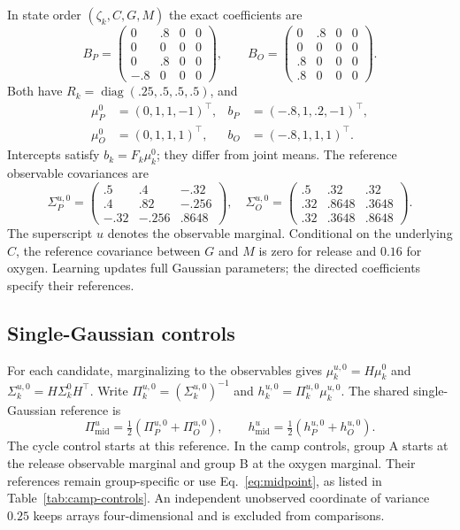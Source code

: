 \documentclass[runningheads]{llncs}
\newcommand{\diag}{\operatorname{diag}}
\begin{document}
In state order $(\zeta_k,C,G,M)$ the exact coefficients are
\begin{equation}
 B_P=\begin{pmatrix}0&.8&0&0\\0&0&0&0\\0&.8&0&0\\-.8&0&0&0\end{pmatrix},\qquad
 B_O=\begin{pmatrix}0&.8&0&0\\0&0&0&0\\.8&0&0&0\\.8&0&0&0\end{pmatrix}.
 \label{eq:B}
\end{equation}
Both have $R_k=\diag(.25,.5,.5,.5)$, and
\begin{equation}
 \begin{aligned}
 \mu^0_P&=(0,1,1,-1)^\top,& b_P&=(-.8,1,.2,-1)^\top,\\
 \mu^0_O&=(0,1,1,1)^\top,& b_O&=(-.8,1,1,1)^\top.
 \end{aligned}
 \label{eq:means-intercepts}
\end{equation}
Intercepts satisfy $b_k=F_k\mu^0_k$; they differ from joint means.
The reference observable covariances are
\begin{equation}
 \Sigma_P^{u,0}=\begin{pmatrix}.5&.4&-.32\\.4&.82&-.256\\-.32&-.256&.8648\end{pmatrix},\quad
 \Sigma_O^{u,0}=\begin{pmatrix}.5&.32&.32\\.32&.8648&.3648\\.32&.3648&.8648\end{pmatrix}.
 \label{eq:observable-covariances}
\end{equation}
The superscript $u$ denotes the observable marginal. Conditional on the
underlying $C$, the reference covariance between $G$ and $M$ is zero for release
and $0.16$ for oxygen. Learning updates full Gaussian parameters; the directed
coefficients specify their references.

\subsection{Single-Gaussian controls}
\label{app:baselines}
For each candidate, marginalizing to the observables gives
$\mu_k^{u,0}=H\mu_k^0$ and $\Sigma_k^{u,0}=H\Sigma_k^0H^\top$.
Write $\Pi_k^{u,0}=(\Sigma_k^{u,0})^{-1}$ and
$h_k^{u,0}=\Pi_k^{u,0}\mu_k^{u,0}$. The shared single-Gaussian reference is
\begin{equation}
 \Pi_{\mathrm{mid}}^u=\tfrac12(\Pi_P^{u,0}+\Pi_O^{u,0}),\qquad
 h_{\mathrm{mid}}^u=\tfrac12(h_P^{u,0}+h_O^{u,0}).
 \label{eq:midpoint}
\end{equation}
The cycle control starts at this reference. In the camp controls, group A starts
at the release observable marginal and group B at the oxygen marginal. Their
references remain group-specific or use Eq.~\eqref{eq:midpoint}, as listed in
Table~\ref{tab:camp-controls}. An independent unobserved coordinate of variance
$0.25$ keeps arrays four-dimensional and is excluded from comparisons.
\end{document}
